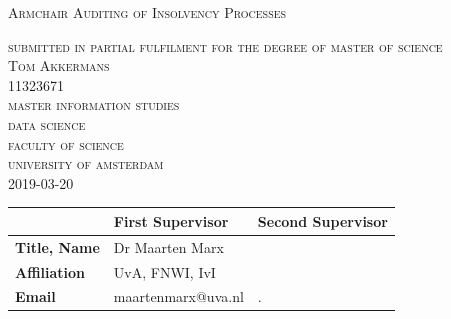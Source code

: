 \begin{titlepage}
\begin{center}

\textsc{\Large Armchair Auditing of Insolvency Processes }


\textsc{\large
	submitted in partial fulfilment for the degree of master of science\\
	Tom Akkermans\\
	11323671\\
	master information studies\\
	data science \\
	faculty of science\\
	university of amsterdam\\
	2019-03-20
}

\end{center}
 
\vfill

\begin{center}
\begin{tabular}{|l||ll|}
\hline
 & \textbf{First Supervisor} & \textbf{Second Supervisor}  \\   
 \hline
\textbf{Title, Name} & Dr Maarten Marx&  \\
\textbf{Affiliation} &UvA, FNWI, IvI & \\ 
\textbf{Email} & maartenmarx@uva.nl& . \\
\hline
\end{tabular}
\end{center}



\end{titlepage}
